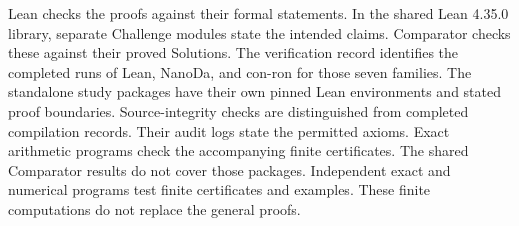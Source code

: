 \documentclass[11pt,a4paper]{article}
\begin{document}
Lean checks the proofs against their formal statements. In the shared Lean 4.35.0 library, separate Challenge modules state the intended claims. Comparator checks these against their proved Solutions. The verification record identifies the completed runs of Lean, NanoDa, and con-ron for those seven families. The standalone study packages have their own pinned Lean environments and stated proof boundaries. Source-integrity checks are distinguished from completed compilation records. Their audit logs state the permitted axioms. Exact arithmetic programs check the accompanying finite certificates. The shared Comparator results do not cover those packages. Independent exact and numerical programs test finite certificates and examples. These finite computations do not replace the general proofs.
\end{document}
